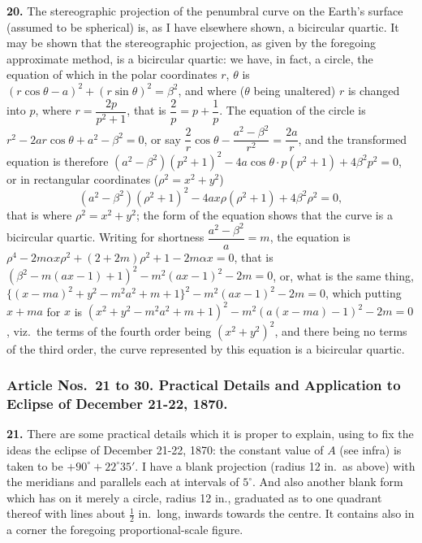 \documentclass[11pt,a4paper]{article}
\begin{document}
\noindent\textbf{20.} The stereographic projection of the penumbral curve on the Earth's surface (assumed to be spherical) is, as I have elsewhere shown, a bicircular quartic. It may be shown that the stereographic projection, as given by the foregoing approximate method, is a bicircular quartic: we have, in fact, a circle, the equation of which in the polar coordinates $r$, $\theta$ is $(r\cos\theta - a)^{2} + (r\sin\theta)^{2} = \beta^{2}$, and where ($\theta$ being unaltered) $r$ is changed into $p$, where $r = \dfrac{2p}{p^{2}+1}$, that is $\dfrac{2}{p} = p + \dfrac{1}{p}$. The equation of the circle is $r^{2} - 2ar\cos\theta + a^{2} - \beta^{2} = 0$, or say $\dfrac{2}{r}\cos\theta - \dfrac{a^{2}-\beta^{2}}{r^{2}} = \dfrac{2a}{r}$, and the transformed equation is therefore $(a^{2}-\beta^{2})(p^{2}+1)^{2} - 4a\cos\theta \cdot p(p^{2}+1) + 4\beta^{2}p^{2} = 0$, or in rectangular coordinates ($\rho^{2} = x^{2} + y^{2}$)
\[
(a^{2}-\beta^{2})(\rho^{2}+1)^{2} - 4ax\rho(\rho^{2}+1) + 4\beta^{2}\rho^{2} = 0,
\]
that is where $\rho^{2} = x^{2} + y^{2}$; the form of the equation shows that the curve is a bicircular quartic. Writing for shortness $\dfrac{a^{2}-\beta^{2}}{a} = m$, the equation is $\rho^{4} - 2m\alpha x \rho^{2} + (2 + 2m)\rho^{2} + 1 - 2m\alpha x = 0$, that is $(\beta^{2} - m(ax-1)+1)^{2} - m^{2}(ax-1)^{2} - 2m = 0$, or, what is the same thing, $\{(x-ma)^{2} + y^{2} - m^{2}a^{2} + m + 1\}^{2} - m^{2}(ax-1)^{2} - 2m = 0$, which putting $x + ma$ for $x$ is $(x^{2} + y^{2} - m^{2}a^{2} + m + 1)^{2} - m^{2}(a(x-ma)-1)^{2} - 2m = 0$, viz.\ the terms of the fourth order being $(x^{2}+y^{2})^{2}$, and there being no terms of the third order, the curve represented by this equation is a bicircular quartic.

\subsubsection*{Article Nos.\ 21 to 30. Practical Details and Application to Eclipse of December 21-22, 1870.}

\noindent\textbf{21.} There are some practical details which it is proper to explain, using to fix the ideas the eclipse of December 21-22, 1870: the constant value of $A$ (see infra) is taken to be $+90^{\circ} + 22^{\circ}35'$. I have a blank projection (radius 12 in.\ as above) with the meridians and parallels each at intervals of $5^{\circ}$. And also another blank form which has on it merely a circle, radius 12 in., graduated as to one quadrant thereof with lines about $\tfrac{1}{2}$ in.\ long, inwards towards the centre. It contains also in a corner the foregoing proportional-scale figure.
\end{document}
